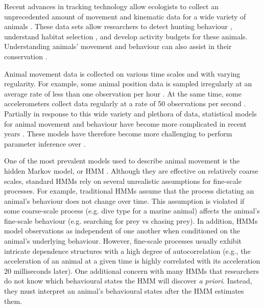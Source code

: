 


Recent advances in tracking technology allow ecologists to collect an unprecedented amount of movement and kinematic data for a wide variety of animals \citep{Patterson:2017}. These data sets allow researchers to detect hunting behaviour \citep{Heerah:2017}, understand habitat selection \citep{Michelot:2019b}, and develop activity budgets \citep{Dot:2016} for these animals. Understanding animals' movement and behaviour can also assist in their conservation \citep{Sutherland:1998,Ogburn:2017}.

Animal movement data is collected on various time scales and with varying regularity. For example, some animal position data is sampled irregularly at an average rate of less than one observation per hour \citep{Gryba:2019}. At the same time, some accelerometers collect data regularly at a rate of 50 observations per second \citep{Daneault:2021}. Partially in response to this wide variety and plethora of data, statistical models for animal movement and behaviour have become more complicated in recent years \citep{Hooten:2017}. These models have therefore become more challenging to perform parameter inference over \citep{McClintock:2012, Michelot:2019b}.

One of the most prevalent models used to describe animal movement is the hidden Markov model, or HMM \citep{McClintock:2020}. Although they are effective on relatively coarse scales, standard HMMs rely on several unrealistic assumptions for fine-scale processes. For example, traditional HMMs assume that the process dictating an animal’s behaviour does not change over time. This assumption is violated if some coarse-scale process (e.g. dive type for a marine animal) affects the animal's fine-scale behaviour (e.g. searching for prey vs chasing prey). In addition, HMMs model observations as independent of one another when conditioned on the animal's underlying behaviour. However, fine-scale processes usually exhibit intricate dependence structures with a high degree of autocorrelation (e.g., the acceleration of an animal at a given time is highly correlated with its acceleration 20 milliseconds later). One additional concern with many HMMs that researchers do not know which behavioural states the HMM will discover \textit{a priori}. Instead, they must interpret an animal's behavioural states after the HMM estimates them.

